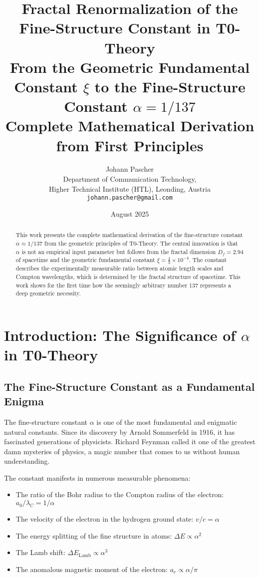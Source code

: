 \documentclass[12pt,a4paper]{article}
\title{\textbf{Fractal Renormalization of the Fine-Structure Constant in T0-Theory}\\[0.5cm]
	\large From the Geometric Fundamental Constant $\xi$ to the Fine-Structure Constant $\alpha = 1/137$\\[0.3cm]
	\normalsize Complete Mathematical Derivation from First Principles}
\author{Johann Pascher\\
	\small Department of Communication Technology,\\
	\small Higher Technical Institute (HTL), Leonding, Austria\\
	\small \texttt{johann.pascher@gmail.com}}
\date{August 2025}
\theoremstyle{definition}
\begin{document}
	
	\maketitle
	
	\begin{abstract}
		This work presents the complete mathematical derivation of the fine-structure constant $\alpha \approx 1/137$ from the geometric principles of T0-Theory. The central innovation is that $\alpha$ is not an empirical input parameter but follows from the fractal dimension $D_f = 2.94$ of spacetime and the geometric fundamental constant $\xi = \frac{4}{3} \times 10^{-4}$. The constant describes the experimentally measurable ratio between atomic length scales and Compton wavelengths, which is determined by the fractal structure of spacetime. This work shows for the first time how the seemingly arbitrary number 137 represents a deep geometric necessity.
	\end{abstract}
	
	\tableofcontents
	\newpage
	
	\section{Introduction: The Significance of $\alpha$ in T0-Theory}
	
	\subsection{The Fine-Structure Constant as a Fundamental Enigma}
	
	The fine-structure constant $\alpha$ is one of the most fundamental and enigmatic natural constants. Since its discovery by Arnold Sommerfeld in 1916, it has fascinated generations of physicists. Richard Feynman called it one of the greatest damn mysteries of physics, a magic number that comes to us without human understanding.
	
	The constant manifests in numerous measurable phenomena:
	\begin{itemize}
		\item The ratio of the Bohr radius to the Compton radius of the electron: $a_0/\lambda_C = 1/\alpha$
		\item The velocity of the electron in the hydrogen ground state: $v/c = \alpha$
		\item The energy splitting of the fine structure in atoms: $\Delta E \propto \alpha^2$
		\item The Lamb shift: $\Delta E_{\text{Lamb}} \propto \alpha^3$
		\item The anomalous magnetic moment of the electron: $a_e \propto \alpha/\pi$
	\end{itemize}
	
\end{document}
